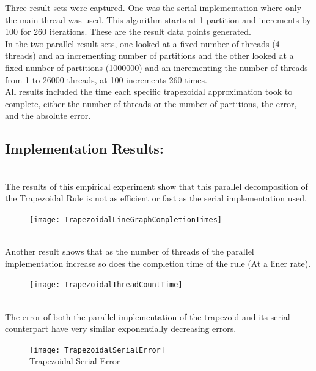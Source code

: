 \documentclass[11pt]{article}
\begin{document}
\begin{page}
\noindent Three result sets were captured. One was the serial implementation where only the main thread was used. This algorithm starts at 1 partition and increments by 100 for 260 iterations. These are the result data points generated.\\

\noindent In the two parallel result sets, one looked at a fixed number of threads (4 threads) and an incrementing number of partitions and the other looked at a fixed number of partitions (1000000) and an incrementing the number of threads from 1 to 26000 threads, at 100 increments 260 times.\\

\noindent All results included the time each specific trapezoidal approximation took to complete, either the number of threads or the number of partitions, the error, and the absolute error.

\subsection{Implementation Results:}\\
\noindent The results of this empirical experiment show that this parallel decomposition of the Trapezoidal Rule is not as efficient or fast as the serial implementation used.

\begin{figure}[ht]
\centering
     \texttt{[image: TrapezoidalLineGraphCompletionTimes]}\\
\end{figure}\\

\noindent Another result shows that as the number of threads of the parallel implementation increase so does the completion time of the rule (At a liner rate).\\

\begin{figure}[ht]
\centering
     \texttt{[image: TrapezoidalThreadCountTime]}\\
\end{figure}\\

\noindent The error of both the parallel implementation of the trapezoid and its serial counterpart have very similar exponentially decreasing errors.

\begin{figure}[ht]
\centering
     \texttt{[image: TrapezoidalSerialError]}\\
     Trapezoidal Serial Error
\end{figure}


\end{page}
\end{document}
